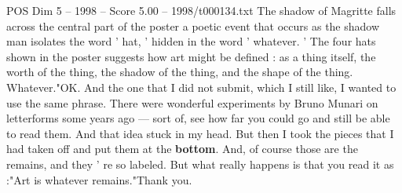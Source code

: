 \begin{textsample}{POS Dim 5 – 1998 – Score 5.00 – 1998/t000134.txt}
The shadow of Magritte falls across the central part of the poster a poetic event that occurs as the shadow man isolates the word ' hat, ' hidden in the word ' whatever. ' The four hats shown in the poster suggests how art might be defined : as a thing itself, the worth of the thing, the shadow of the thing, and the shape of the thing.
Whatever."OK.
And the one that I did not submit, which I still like, I wanted to use the same phrase.
There were wonderful experiments by Bruno Munari on letterforms some years ago — sort of, see how far you could go and still be able to read them.
And that idea stuck in my head.
But then I took the pieces that I had taken off and put them at the \textbf{bottom}.
And, of course those are the remains, and they ' re so labeled.
But what really happens is that you read it as :"Art is whatever remains."Thank you.

\end{textsample}
